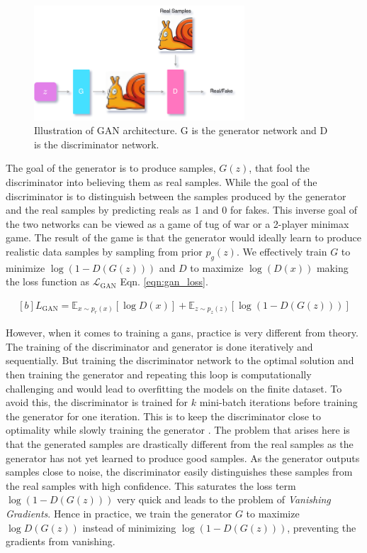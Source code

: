 \begin{figure}[h]
    \centering
    \includegraphics[width=0.7\textwidth]{figures/arch/gan_arch.png}
    \caption{Illustration of GAN architecture. G is the generator network and D is the discriminator network.}
    \label{fig:gan_arch}
\end{figure}

The goal of the generator is to produce samples, $G(z)$, that fool the discriminator into believing them as real samples. While the goal of the discriminator is to distinguish between the samples produced by the generator and the real samples by predicting reals as 1 and 0 for fakes. This inverse goal of the two networks can be viewed as a game of tug of war or a 2-player minimax game. The result of the game is that the generator would ideally learn to produce realistic data samples by sampling from prior $p_{g}(z)$. We effectively train $G$ to minimize $\log(1-D(G({z})))$ and $D$ to maximize $\log(D(x))$ making the loss function as $\mathcal{L}_{\mathrm{GAN}}$ Eqn. \ref{eqn:gan_loss}.

\begin{equation} \label{eqn:gan_loss}
    \begin{gathered}[b]
        {L}_{\mathrm{GAN}}=\mathbb{E}_{{x} \sim p_{r}(x)}[\log D({x})]+\mathbb{E}_{{z} \sim p_{z}(z)}[\log (1-D(G({z})))]
    \end{gathered}
\end{equation}

However, when it comes to training a \acp{gan}, practice is very different from theory. The training of the discriminator and generator is done iteratively and sequentially. But training the discriminator network to the optimal solution and then training the generator and repeating this loop is computationally challenging and would lead to overfitting the models on the finite dataset. To avoid this, the discriminator is trained for $k$ mini-batch iterations before training the generator for one iteration. This is to keep the discriminator close to optimality while slowly training the generator \cite{goodfellow2014generative}. The problem that arises here is that the generated samples are drastically different from the real samples as the generator has not yet learned to produce good samples. As the generator outputs samples close to noise, the discriminator easily distinguishes these samples from the real samples with high confidence. This saturates the loss term $\log (1-D(G(z)))$ very quick and leads to the problem of \textit{Vanishing Gradients}. Hence in practice, we train the generator $G$ to maximize $\log D(G(z))$ instead of minimizing $\log (1-D(G(z)))$, preventing the gradients from vanishing.

